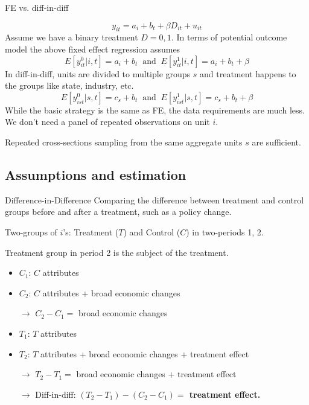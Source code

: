\documentclass{beamer}
\begin{document}
\begin{frame}{FE vs. diff-in-diff}

\[y_{it} = a_i+ b_t + \beta D_{it}+u_{it} \]
Assume we have a binary treatment $D=0,1$. In terms of potential outcome model the above fixed effect regression assumes
\[ E[y^0_{it}|i,t]=a_i+b_t \ \text{  and  } \ E[y^1_{it}|i,t]=a_i+b_t+\beta  \]
In diff-in-diff, units are divided to multiple groups $s$ and treatment happens to the groups like state, industry, etc. 
\[ E[y^0_{ist}|s,t]=c_s+b_t \ \text{  and  } \ E[y^1_{ist}|s,t]=c_s+b_t+\beta  \]
While the basic strategy is the same as FE, the data requirements are much less. We don't need a panel of repeated observations on unit $i$.

Repeated cross-sections sampling from the same aggregate units $s$ are sufficient.
\end{frame}

\subsection{Assumptions and estimation}
\begin{frame}{Difference-in-Difference }
Comparing the difference between treatment and control groups before and after a treatment, such as a policy change.\medskip

Two-groups of $i$'s: Treatment ($T$) and Control ($C$) in two-periods 1, 2. \medskip

Treatment group in period 2 is the subject of the treatment.
\pause
\begin{itemize}
\item $C_1$: $C$ attributes
\item $C_2$: $C$ attributes + broad economic changes
\item[$\rightarrow$] $C_2-C_1=$ broad economic changes
\pause
\item $T_1$: $T$ attributes
\item $T_2$: $T$ attributes + broad economic changes + treatment effect
\item[$\rightarrow$] $T_2-T_1=$ broad economic changes + treatment effect
\pause
\item[$\rightarrow$] Diff-in-diff: \textbf{$(T_2-T_1)-(C_2-C_1)=$ treatment effect.} 
\end{itemize}
\end{frame}
\end{document}
